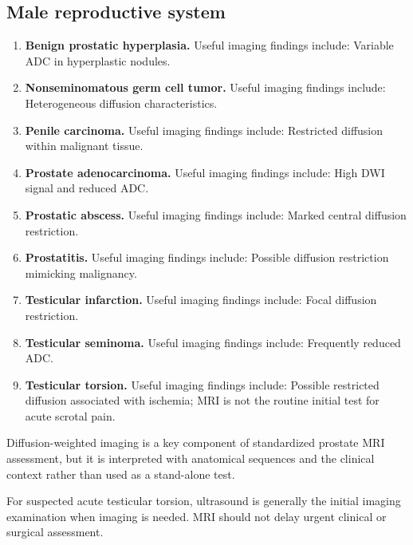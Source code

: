 \subsection{Male reproductive system}
\begin{enumerate}[leftmargin=*,itemsep=0.45em,topsep=0.4em]
\item \textbf{Benign prostatic hyperplasia.} Useful imaging findings include: Variable ADC in hyperplastic nodules.
\item \textbf{Nonseminomatous germ cell tumor.} Useful imaging findings include: Heterogeneous diffusion characteristics.
\item \textbf{Penile carcinoma.} Useful imaging findings include: Restricted diffusion within malignant tissue.
\item \textbf{Prostate adenocarcinoma.} Useful imaging findings include: High DWI signal and reduced ADC.
\item \textbf{Prostatic abscess.} Useful imaging findings include: Marked central diffusion restriction.
\item \textbf{Prostatitis.} Useful imaging findings include: Possible diffusion restriction mimicking malignancy.
\item \textbf{Testicular infarction.} Useful imaging findings include: Focal diffusion restriction.
\item \textbf{Testicular seminoma.} Useful imaging findings include: Frequently reduced ADC.
\item \textbf{Testicular torsion.} Useful imaging findings include: Possible restricted diffusion associated with ischemia; MRI is not the routine initial test for acute scrotal pain.
\end{enumerate}
Diffusion-weighted imaging is a key component of standardized prostate MRI assessment, but it is interpreted with anatomical sequences and the clinical context rather than used as a stand-alone test.

For suspected acute testicular torsion, ultrasound is generally the initial imaging examination when imaging is needed. MRI should not delay urgent clinical or surgical assessment.

